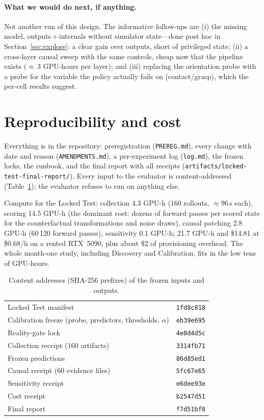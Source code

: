 \documentclass[11pt,a4paper]{article}
\begin{document}
\paragraph{What we would do next, if anything.} Not another run of this design. The informative follow-ups are (i) the missing model, outputs\,+\,internals without simulator state---done post hoc in Section~\ref{sec:explore}: a clear gain over outputs, short of privileged state; (ii) a cross-layer causal sweep with the same controls, cheap now that the pipeline exists ($\approx$\,3 GPU-hours per layer); and (iii) replacing the orientation probe with a probe for the variable the policy actually fails on (contact/grasp), which the per-cell results suggest.

\section{Reproducibility and cost}
\label{sec:repro}
Everything is in the repository: preregistration (\texttt{PREREG.md}), every change with date and reason (\texttt{AMENDMENTS.md}), a per-experiment log (\texttt{log.md}), the frozen locks, the runbook, and the final report with all receipts (\texttt{artifacts/locked-test-final-report/}). Every input to the evaluator is content-addressed (Table~\ref{tab:hashes}); the evaluator refuses to run on anything else.

Compute for the Locked Test: collection 4.3 GPU-h (160 rollouts, $\approx 96$\,s each), scoring 14.5 GPU-h (the dominant cost: dozens of forward passes per scored state for the counterfactual transformations and noise draws), causal patching 2.8 GPU-h (60\,120 forward passes), sensitivity 0.1 GPU-h; 21.7 GPU-h and \$14.81 at \$0.68/h on a rented RTX~5090, plus about \$2 of provisioning overhead. The whole month-one study, including Discovery and Calibration, fits in the low tens of GPU-hours.

\begin{table}[htbp]
\centering\small
\caption{Content addresses (SHA-256 prefixes) of the frozen inputs and outputs.}
\label{tab:hashes}
\begin{tabular}{ll}
\toprule
Locked Test manifest & \texttt{1fd8c818} \\
Calibration freeze (probe, predictors, thresholds, $\alpha$) & \texttt{eb39e695} \\
Reality-gate lock & \texttt{4e0d4d5c} \\
Collection receipt (160 artifacts) & \texttt{3314fb71} \\
Frozen predictions & \texttt{86d85ed1} \\
Causal receipt (60 evidence files) & \texttt{5fc67e65} \\
Sensitivity receipt & \texttt{e6dee93e} \\
Cost receipt & \texttt{b2547d51} \\
Final report & \texttt{f7d51bf8} \\
\bottomrule
\end{tabular}
\end{table}
\end{document}

